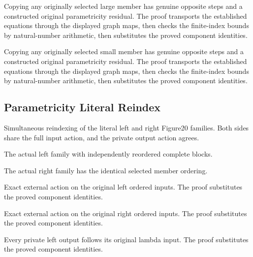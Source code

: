 Copying any originally selected large member has genuine opposite
steps and a constructed original parametricity residual.
The proof transports the established equations through the displayed graph maps, then checks the finite-index bounds by natural-number arithmetic, then substitutes the proved component identities.
\par{}

Copying any originally selected small member has genuine opposite
steps and a constructed original parametricity residual.
The proof transports the established equations through the displayed graph maps, then checks the finite-index bounds by natural-number arithmetic, then substitutes the proved component identities.
\par{}

\subsection{Parametricity Literal Reindex}
Simultaneous reindexing of the literal left and right Figure20 families.
Both sides share the full input action, and the private output action agrees.

The actual left family with independently reordered complete blocks.
\par{}

The actual right family has the identical selected member ordering.
\par{}

Exact external action on the original left ordered inputs.
The proof substitutes the proved component identities.
\par{}

Exact external action on the original right ordered inputs.
The proof substitutes the proved component identities.
\par{}

Every private left output follows its original lambda input.
The proof substitutes the proved component identities.
\par{}

